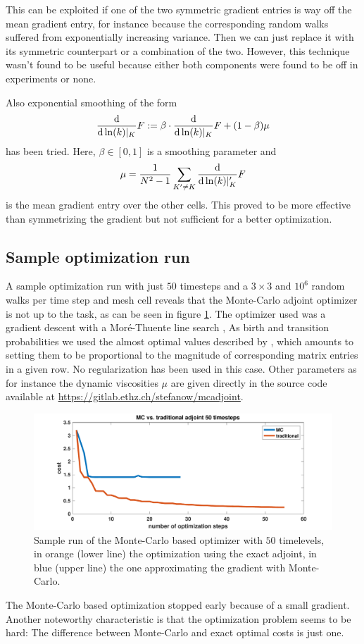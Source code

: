 \documentclass[twoside]{IEEEtran}
\renewcommand*{\d}[1]{\ensuremath{\mathrm{d}#1}}
\newcommand*{\diff}[2]{\ensuremath{\frac{\d}{\d{#2}}{#1}}}
\begin{document}
This can be exploited if one of the two symmetric gradient entries is way off the mean gradient entry, for instance because the corresponding random walks suffered from exponentially increasing variance. Then we can just replace it with its symmetric counterpart or a combination of the two.
However, this technique wasn't found to be useful because either both components were found to be off in experiments or none.

Also exponential smoothing of the form
\begin{equation}
\diff{F}{\ln(k)\rvert_K} := \beta \cdot \diff{F}{\ln(k)\rvert_K} + (1 - \beta)\mu
\end{equation}
has been tried.
Here, $\beta \in [0, 1]$ is a smoothing parameter and
\begin{equation}
\mu = \frac{1}{N^2 - 1}\sum_{K^\prime \neq K} \diff{F}{\ln(k)\rvert_K^\prime}
\end{equation}
is the mean gradient entry over the other cells.
This proved to be more effective than symmetrizing the gradient but not sufficient for a better optimization.

\subsection{Sample optimization run}
A sample optimization run with just $50$ timesteps and a $3 \times 3$ and $10^6$ random walks per time step and mesh cell reveals that the Monte-Carlo adjoint optimizer is not up to the task, as can be seen in figure \ref{sampleRun}.
The optimizer used was a gradient descent with a Moré-Thuente line search \cite{morethuente},
As birth and transition probabilities we used the almost optimal values described by \cite{unsteady}, which amounts to setting them to be proportional to the magnitude of corresponding matrix entries in a given row.
No regularization has been used in this case.
Other parameters as for instance the dynamic viscosities $\mu$ are given directly in the source code available at \href{https://gitlab.ethz.ch/stefanow/mcadjoint}{https://gitlab.ethz.ch/stefanow/mcadjoint}.
\begin{figure}
	\centering
	\includegraphics[width=\linewidth]{mctrad50}
	\caption{Sample run of the Monte-Carlo based optimizer with $50$ timelevels, in orange (lower line) the optimization using the exact adjoint, in blue (upper line) the one approximating the gradient with Monte-Carlo.}
	\label{sampleRun}
\end{figure}
The Monte-Carlo based optimization stopped early because of a small gradient.
Another noteworthy characteristic is that the optimization problem seems to be hard:
The difference between Monte-Carlo and exact optimal costs is just one.
\end{document}

